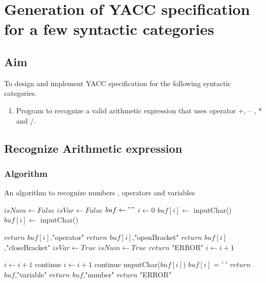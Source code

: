 \clearpage
\chapter{Generation of YACC specification for a few syntactic categories}

\section{Aim}
To design and implement YACC specification for the following syntactic categories.
\begin{enumerate}
	\item Program to recognize a valid arithmetic expression that uses operator +, – , * and /.
\end{enumerate}


\section{Recognize Arithmetic expression}
\subsection{Algorithm}
\begin{algorithm}[H]
	\caption{An algorithm to recognize numbers , operators and variables}
	\begin{algorithmic}[1]
		\State $isNum \gets False$
		\State $isVar \gets False$
		\State $buf \gets ""$
		\State $i \gets 0$
		\State $buf[i] \gets $ inputChar()
		\State $buf[i] \gets $ inputChar()
		\EndWhile
		
		\State $return$ $buf[i]$,"operator"
		\State $return$ $buf[i]$,"openBracket"
		\State $return$ $buf[i]$,"closeBracket"
		\State $isVar \gets True$
		\State $isNum \gets True$
		\Else
		\State $return$ "ERROR"
		\EndIf
		\State $i \gets i+1$
		
		\State $i \gets i + 1$
		\State continue
		\State $i \gets i + 1$
		\State continue
		\Else
		\State unputChar($buf[i]$) 
		\State $buf[i]$ = $'\ '$
		\State $return$ $buf$,"variable"
		\State $return$ $buf$,"number"
		\Else
		\State $return$ "ERROR"
		\EndIf
		\EndIf
		\EndWhile
	\end{algorithmic}
\end{algorithm}

